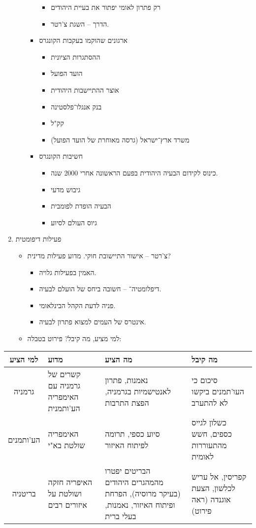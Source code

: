 \documentclass[]{article}
\begin{document}
\begin{multicols}{2}
\begin{enumerate}
\begin{itemize}
\begin{itemize}
\begin{itemize}
						\item רק פתרון לאומי יפתור את בעיית היהודים
						\item הדרך – השגת צ'רטר. 
					\end{itemize}
					\item ארגונים שהוקמו בעקבות הקונגרס
					\begin{itemize}
						\item ההסתגרות הציונית
						\item הועד הפועל
						\item אוצר ההתיישבות היהודית
						\item בנק אנגלו־פלסטינה
						\item קק"ל
						\item משרד ארץ־ישראל (גרסה מאוחרת של הועד הפועל)
					\end{itemize}
					\item חשיבות הקונגרס
					\begin{itemize}
						\item כינוס לקידום הבעיה היהודית בפעם הראשונה אחרי 2000 שנה.
						\item גיבוש מדעי
						\item הבעיה הופדת לפומבית
						\item גיוס העולם לסיוע
					\end{itemize}
				\end{itemize}
			\end{itemize}
			\item פעילות דיפומטית
			\begin{itemize}
				\item צ'רטר – אישור התיישובת חוקי. מדוע פעילות מדינית? 
				\begin{itemize}
					\item האמין בפעילות גלויה. 
					\item דיפלומטיה־ – חשובה ביחס של הועלם לבעיה. 
					\item פניה לדעת הקהל הבינלאומי. 
					\item אינטרס של העמים למצוא פתרון לבעיה. 
				\end{itemize}
				\item למי מציע, מה קיבל? פירוט בטבלה: 
			\end{itemize}
		\end{enumerate}
	\end{multicols}
	\begin{tabularx}{\textwidth}{|c|X|X|X|}
		\hline למי הציע & מדוע & מה הציע & מה קיבל \\
		\hline גרמניה & קשרים של גרמניה עם האימפריה הע'ותמנית & נאמנות, פתרון לאנטישמיות בגרמניה, הפצת התרבות & סיכום כי העו'תמנים ביקשו לא להתערב \\
		\hline הע'ותמנים & האימפריה שולטת בא"י & סיוע כספי, תרומה לפיתוח האיזור & כשלון לגייס כספים, חשש מהתעוררות לאומית \\
		\hline בריטניה & האיפריה חזקה ושולטת על איזורים רבים & הבריטים יפטרו מהמהגרים היהודים (בעיקר מרוסיה), הפרחת ופיתוח האיזור, נאמנות, בעלי ברית & קפריסין, אל עריש לכלשון, הצעת אוגנדה (ראה פירוט) \\ \hline
	\end{tabularx}
	
\end{document}
